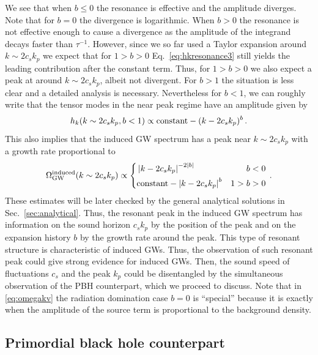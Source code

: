 \documentclass[a4paper,11pt]{article}
\numberwithin{equation}{section}
\begin{document}
We see that when $b\leq0$ the resonance is effective and the amplitude diverges. Note that for $b=0$ the divergence is logarithmic. When $b>0$ the resonance is not effective enough to cause a divergence as the amplitude of the integrand decays faster than $\tau^{-1}$. However, since we so far used a Taylor expansion around $k\sim 2c_sk_p$ we expect that for $1>b>0$ Eq.~\eqref{eq:hkresonance3} still yields the leading contribution after the constant term. Thus, for $1>b>0$ we also expect a peak at around $k\sim 2c_sk_p$, albeit not divergent. For $b>1$ the situation is less clear and a detailed analysis is necessary. Nevertheless for $b<1$, we can roughly write that the tensor modes in the near peak regime have an amplitude given by
\begin{equation}\label{eq:hkvsol}
h_k(k\sim 2c_sk_p,b<1)\propto {\rm constant}-(k-2c_sk_p)^{b}\,.
\end{equation}
This also implies that the induced GW spectrum has a peak near $k\sim 2c_sk_p$ with a growth rate proportional to
\begin{align}\label{eq:omegakv}
\Omega_{\rm GW}^{\rm induced}(k\sim 2c_sk_p)\propto \left\{
\begin{aligned}
&\left|k-{2c_sk_p}\right|^{-2|b|} & b<0\\
&{\rm constant}-\left|k-{2c_sk_p}\right|^{b} & 1>b>0
\end{aligned}
\right.\,.
\end{align}
These estimates will be later checked by the general analytical solutions in Sec.~\ref{sec:analytical}. Thus, the resonant peak in the induced GW spectrum has information on the sound horizon $c_sk_p$ by the position of the peak and on the expansion history $b$ by the growth rate around the peak. This type of resonant structure is characteristic of induced GWs. Thus, the observation of such resonant peak could give strong evidence for induced GWs. Then, the sound speed of fluctuations $c_s$ and the peak $k_p$ could be disentangled by the simultaneous observation of the PBH counterpart, which we proceed to discuss. Note that in \eqref{eq:omegakv}
the radiation domination case $b=0$ is ``special'' because it is exactly when the amplitude of the source term is proportional to the background density.


\subsection{Primordial black hole counterpart \label{sec:PBH}}
\end{document}
